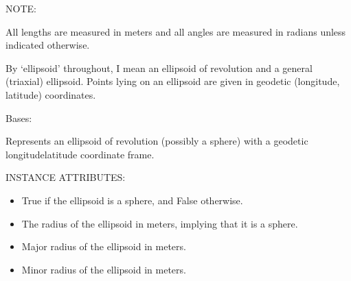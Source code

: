 \documentclass[a4paper,12ptopenany,oneside,english]{sphinxmanual}
\begin{document}
\sphinxAtStartPar
NOTE:

\sphinxAtStartPar
All lengths are measured in meters and all angles are measured in radians
unless indicated otherwise.

\sphinxAtStartPar
By ‘ellipsoid’ throughout, I mean an ellipsoid of revolution and  a general (triaxial) ellipsoid.
Points lying on an ellipsoid are given in geodetic (longitude, latitude) coordinates.

\begin{fulllineitems}
\label{\detokenize{ellipsoids:rhealpixdggs.ellipsoids.Ellipsoid}}
\pysigstartsignatures
{}
\pysigstopsignatures
\sphinxAtStartPar
Bases: 

\sphinxAtStartPar
Represents an ellipsoid of revolution (possibly a sphere) with a
geodetic longitude\sphinxhyphen{}latitude coordinate frame.

\sphinxAtStartPar
INSTANCE ATTRIBUTES:
\begin{itemize}
\item {} 
\sphinxAtStartPar
{} \sphinxhyphen{} True if the ellipsoid is a sphere, and False otherwise.

\item {} 
\sphinxAtStartPar
{} \sphinxhyphen{} The radius of the ellipsoid in meters, implying that it is a
sphere.

\item {} 
\sphinxAtStartPar
{} \sphinxhyphen{} Major radius of the ellipsoid in meters.

\item {} 
\sphinxAtStartPar
{} \sphinxhyphen{} Minor radius of the ellipsoid in meters.


\end{itemize}
\end{fulllineitems}
\end{document}
